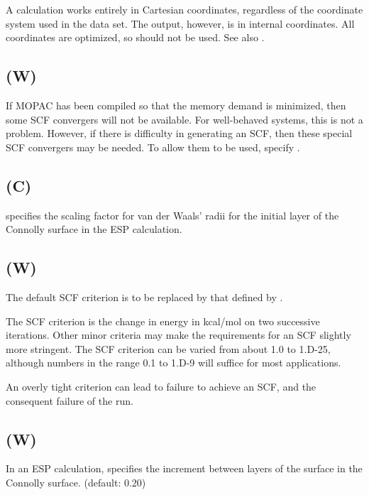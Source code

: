 A  calculation works entirely in Cartesian coordinates, regardless
of the coordinate system used in the data set.  The output, however, is
in internal coordinates.  All coordinates are optimized, so 
should not be used.  See also .

\subsection*{ (W)}
\label{safe}
If MOPAC has been compiled so that the memory demand is minimized, then some
SCF convergers will not be available.  For well-behaved systems, this is not
a problem.  However, if there is difficulty in generating an SCF, then these
special SCF convergers may be needed.  To allow them to be used, specify
.
\subsection*{ (C)}
         specifies the scaling factor for van der Waals' radii  for
   the initial layer of the Connolly surface in the ESP calculation.

\subsection*{ (W)}
        The default SCF criterion is to  be  replaced  by  that  defined  by
   .

        The SCF criterion is  the  change  in  energy  in  kcal/mol  on  two
   successive  iterations.   Other  minor criteria may make the requirements
   for an SCF slightly more stringent.  The SCF criterion can be varied from
   about 1.0 to 1.D-25, although numbers in the range 0.1 to 1.D-9 will
   suffice for most applications.

        An overly tight criterion can lead to failure to achieve an SCF,  and
   the consequent failure of the run.

\subsection*{ (W)}
        In an ESP calculation,  specifies the  increment  between
   layers of the surface in the Connolly surface.  (default:  0.20)


